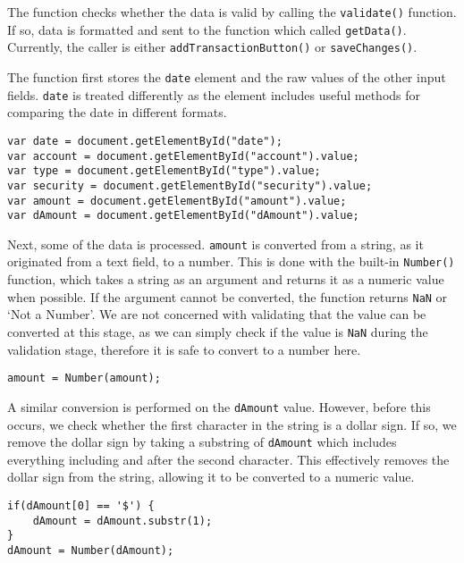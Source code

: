 \documentclass[letterpaper]{article}
\begin{document}
The function checks whether the data is valid by calling the \lstinline{validate()} function.
If so, data is formatted and sent to the function which called \lstinline{getData()}.
Currently, the caller is either \lstinline{addTransactionButton()} or \lstinline{saveChanges()}.

The function first stores the \lstinline{date} element and the raw values of the other input fields.
\lstinline{date} is treated differently as the element includes useful methods for comparing the date in different formats.

\begin{lstlisting}[firstnumber=2]
var date = document.getElementById("date");
var account = document.getElementById("account").value;
var type = document.getElementById("type").value;
var security = document.getElementById("security").value;
var amount = document.getElementById("amount").value;
var dAmount = document.getElementById("dAmount").value;
\end{lstlisting}

Next, some of the data is processed.
\lstinline{amount} is converted from a string, as it originated from a text field, to a number.
This is done with the built-in \lstinline{Number()} function, which takes a string as an argument and returns it as a numeric value when possible.
If the argument cannot be converted, the function returns \lstinline{NaN} or `Not a Number'.
We are not concerned with validating that the value can be converted at this stage, as we can simply check if the value is \lstinline{NaN} during the validation stage, therefore it is safe to convert to a number here.

\begin{lstlisting}[firstnumber=9]
amount = Number(amount);
\end{lstlisting}

A similar conversion is performed on the \lstinline{dAmount} value.
However, before this occurs, we check whether the first character in the string is a dollar sign.
If so, we remove the dollar sign by taking a substring of \lstinline{dAmount} which includes everything including and after the second character.
This effectively removes the dollar sign from the string, allowing it to be converted to a numeric value.

\begin{lstlisting}[firstnumber=9]
if(dAmount[0] == '$') {
    dAmount = dAmount.substr(1);
}
dAmount = Number(dAmount);
\end{lstlisting}
\end{document}
